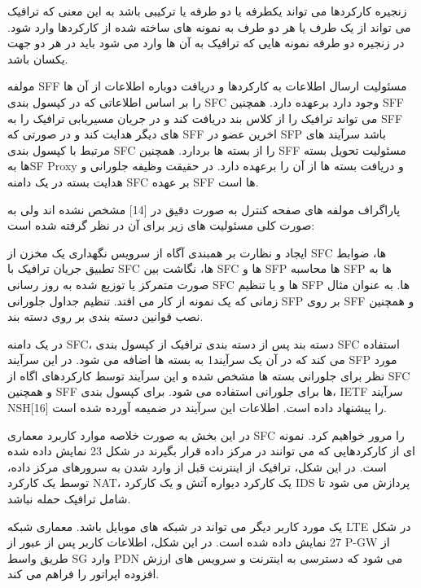 زنجیره کارکردها می تواند یکطرفه یا دو طرفه یا ترکیبی باشد به این معنی که ترافیک می تواند از یک طرف یا هر دو طرف به نمونه های ساخته شده از کارکردها وارد شود. در زنجیره دو طرفه نمونه هایی که ترافیک به آن ها وارد می شود باید در هر دو جهت یکسان باشد.


مولفه SFF مسئولیت ارسال اطلاعات به کارکردها و دریافت دوباره اطلاعات از آن ها را بر اساس اطلاعاتی که در کپسول بندی SFC وجود دارد برعهده دارد. همچنین SFF می تواند ترافیک را از کلاس بند دریافت کند و در جریان مسیریابی ترافیک را به SFF های دیگر هدایت کند و در صورتی که SFF اخرین عضو در SFP باشد سرآیند های مرتبط با کپسول بندی SFC را از بسته ها بردارد. همچنین SFF مسئولیت تحویل بسته ها بهSF Proxy و دریافت بسته ها از آن را برعهده دارد. در حقیقت وظیفه جلورانی و هدایت بسته در یک دامنه SFC بر عهده SFF ها است.


پاراگراف{}
 مولفه های صفحه کنترل به صورت دقیق در [14] مشخص نشده اند ولی به صورت کلی مسئولیت های زیر برای آن در نظر گرفته شده است:


 ایجاد و نظارت بر همبندی آگاه از سرویس
 نگهداری یک مخزن از SFC ها، ضوابط تطبیق جریان ترافیک با SFC ها، نگاشت بین SFC ها و SFP ها
 محاسبه SFP ها به صورت متمرکز یا توزیع شده
 به روز رسانی SFC ها و یا تنظیم SFP ها. به عنوان مثال زمانی که یک نمونه از کار می افتد.
 تنظیم جداول جلورانی SFP بر روی SFF و همچنین نصب قوانین دسته بندی بر روی دسته بند.



در یک دامنه SFC، دسته بند پس از دسته بندی ترافیک از کپسول بندی SFC استفاده می کند که در آن یک سرآیند1 به بسته ها اضافه می شود. در این سرآیند SFP مورد نظر برای جلورانی بسته ها مشخص شده و این سرآیند توسط کارکردهای اگاه از SFC و همچنین SFF ها برای جلورانی استفاده می شود. برای کپسول بندی، IETF سرآیند NSH[16] را پیشنهاد داده است. اطلاعات این سرآیند در ضمیمه آورده شده است.


در این بخش به صورت خلاصه موارد کاربرد معماری SFC را مرور خواهیم کرد. نمونه ای از کارکردهایی که می توانند در مرکز داده قرار بگیرند در شکل 23 نمایش داده شده است. در این شکل، ترافیک از اینترنت قبل از وارد شدن به سرورهای مرکز داده، توسط یک کارکرد NAT، یک کارکرد دیواره آتش و یک کارکرد IDS پردازش می شود تا شامل ترافیک حمله نباشد.

یک مورد کاربر دیگر می تواند در شبکه های موبایل باشد. معماری شبکه LTE در شکل 27  نمایش داده شده است. در این شکل، اطلاعات کاربر پس از عبور از P-GW از طریق واسط SG وارد PDN می شود که دسترسی به اینترنت و سرویس های ارزش افزوده اپراتور را فراهم می کند.


